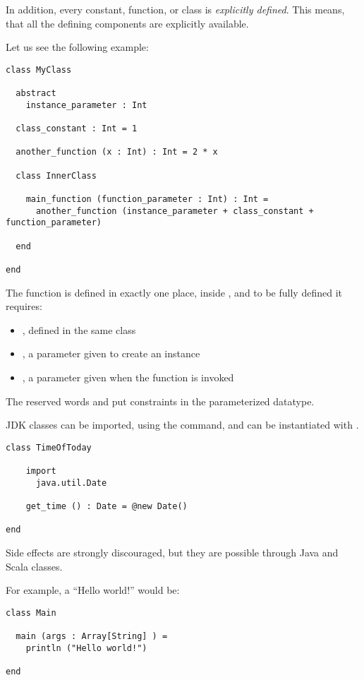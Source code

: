 In addition, every constant, function, or class is \emph{explicitly defined}.
This means, that all the defining components are explicitly available.

Let us see the following example:
\begin{lstlisting}[label={lst:exampleExplicitDefinition}]
class MyClass

  abstract
    instance_parameter : Int

  class_constant : Int = 1

  another_function (x : Int) : Int = 2 * x

  class InnerClass

    main_function (function_parameter : Int) : Int =
      another_function (instance_parameter + class_constant + function_parameter)

  end

end
\end{lstlisting}

The function  is defined in exactly one place, inside , and to be fully defined it requires:
\begin{itemize}
    \item {}, defined in the same class
    \item {}, a parameter given to create an instance
    \item {}, a parameter given when the function is invoked
\end{itemize}

The reserved words \sodasubtype and \sodasupertype put constraints in the parameterized datatype.

JDK classes can be imported, using the \sodaimport command, and can be instantiated with \sodanew.

\begin{lstlisting}[label={lst:exampleJDKImport}]
class TimeOfToday

    import
      java.util.Date

    get_time () : Date = @new Date()

end
\end{lstlisting}

Side effects are strongly discouraged, but they are possible through Java and Scala classes.

For example, a ``Hello world!'' would be:
\begin{lstlisting}[label={lst:exampleHelloWorld}]
class Main

  main (args : Array[String] ) =
    println ("Hello world!")

end
\end{lstlisting}

